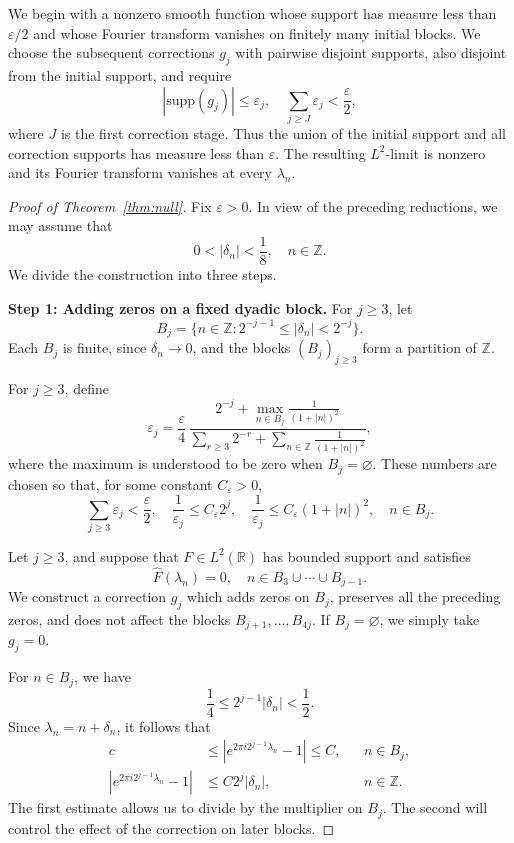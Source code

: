 \documentclass[reqno,a4paper,12pt]{amsart}
\numberwithin{equation}{section}
\def\Z{{\mathbb Z}}
\def\R{{\mathbb R}}
\newcommand{\supp}{{\mathrm{supp}}}
\newcommand\1{\mathds{1}}
\begin{document}
We begin with a nonzero smooth function whose support has measure less than \(\varepsilon/2\) and whose Fourier transform vanishes on finitely many initial blocks. We choose the subsequent corrections \(g_j\) with pairwise disjoint supports, also disjoint from the initial support, and require
\[
    |\supp (g_j)|\leq\varepsilon_j,
    \quad
    \sum_{j\geq J}\varepsilon_j<\frac{\varepsilon}{2},
\]
where \(J\) is the first correction stage. Thus the union of the
initial support and all correction supports has measure less than
\(\varepsilon\). The resulting \(L^2\)-limit is nonzero and its
Fourier transform vanishes at every \(\lambda_n\).

\begin{proof}[Proof of Theorem~\ref{thm:null}]
Fix \(\varepsilon>0\). In view of the preceding reductions, we may
assume that
\[
    0<|\delta_n|<\frac18,\quad n\in\Z.
\]
We divide the construction into three steps.

\medskip
\noindent\textbf{Step 1: Adding zeros on a fixed dyadic block.}
For \(j\geq3\), let
\[
    B_j=\{n\in\Z:2^{-j-1}\leq|\delta_n|<2^{-j}\}.
\]
Each \(B_j\) is finite, since \(\delta_n\to0\), and the blocks
\((B_j)_{j\geq3}\) form a partition of \(\Z\).

For \(j\geq3\), define
\[
    \varepsilon_j
    =\frac{\varepsilon}{4}\,
    \frac{
        2^{-j}+\displaystyle\max_{n\in B_j}\frac1{(1+|n|)^2}
    }{
        \displaystyle\sum_{r\geq3}2^{-r}
        +\displaystyle\sum_{n\in\Z}\frac1{(1+|n|)^2}
    },
\]
where the maximum is understood to be zero when \(B_j=\varnothing\). These numbers are chosen so that, for some constant
\(C_\varepsilon>0\),
\begin{equation}\label{eq:asymp-support-budget}
    \sum_{j\geq3}\varepsilon_j<\frac{\varepsilon}{2},
    \quad
    \frac1{\varepsilon_j}\leq C_\varepsilon 2^j,
    \quad
    \frac1{\varepsilon_j}
    \leq C_\varepsilon(1+|n|)^2,
    \quad n\in B_j.
\end{equation}

Let \(j\geq3\), and suppose that \(F\in L^2(\R)\) has bounded support and satisfies
\[
    \widehat F(\lambda_n)=0,
    \quad n\in B_3\cup\cdots\cup B_{j-1}.
\]
We construct a correction \(g_j\) which adds zeros on \(B_j\), preserves all the preceding zeros, and does not affect the blocks \(B_{j+1},\ldots,B_{4j}\). If \(B_j=\varnothing\), we simply take \(g_j=0\).

For \(n\in B_j\), we have
\[
    \frac14\leq2^{j-1}|\delta_n|<\frac12.
\]
Since \(\lambda_n=n+\delta_n\), it follows that
\begin{equation}\label{eq:asymp-dyadic-multiplier}
\begin{aligned}
    c
    &\leq
    \left|e^{2\pi i2^{j-1}\lambda_n}-1\right|
    \leq C,
    && n\in B_j,\\
    \left|e^{2\pi i2^{j-1}\lambda_n}-1\right|
    &\leq C2^j|\delta_n|,
    && n\in\Z.
\end{aligned}
\end{equation}
The first estimate allows us to divide by the multiplier on \(B_j\).
The second will control the effect of the correction on later blocks.


\end{proof}
\end{document}
